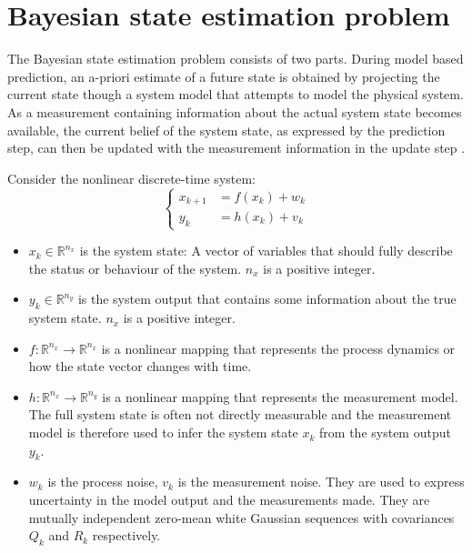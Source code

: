 \section{Bayesian state estimation problem}

The Bayesian state estimation problem consists of two parts. During model based prediction, an a-priori estimate of a future state is obtained by projecting the current state though a system model that attempts to model the physical system. As a measurement containing information about the actual system state becomes available, the current belief of the system state, as expressed by the prediction step, can then be updated with the measurement information in the update step \citep{Fang2018}. 

Consider the nonlinear discrete-time system:
\begin{equation}
	\left\{\begin{aligned}
	x_{k+1} &=f\left(x_{k}\right)+w_{k} \\
	y_{k} &=h\left(x_{k}\right)+v_{k}
	\end{aligned}\right.
\end{equation}

\begin{itemize}
	\item $x_{k} \in \mathbb{R}^{n_{x}}$ is the system state: A vector of variables that should fully describe the status or behaviour of the system. $n_{x}$ is a positive integer.
	\item $y_{k} \in \mathbb{R}^{n_{y}}$ is the system output that contains some information about the true system state. $n_{x}$ is a positive integer.
	\item $f: \mathbb{R}^{n_{x}} \rightarrow \mathbb{R}^{n_{x}}$ is a nonlinear mapping that represents the process dynamics or how the state vector changes with time. 
	\item $h: \mathbb{R}^{n_{x}} \rightarrow \mathbb{R}^{n_{y}}$ is a nonlinear mapping that represents the measurement model. The full system state is often not directly measurable and the measurement model is therefore used to infer the system state $x_{k}$ from the system output $y_{k}$.
	\item $w_{k}$ is the process noise, $v_{k}$ is the measurement noise. They are used to express uncertainty in the model output and the measurements made. They are mutually independent zero-mean white Gaussian sequences with covariances $Q_{k}$ and $R_{k}$ respectively.
\end{itemize}

